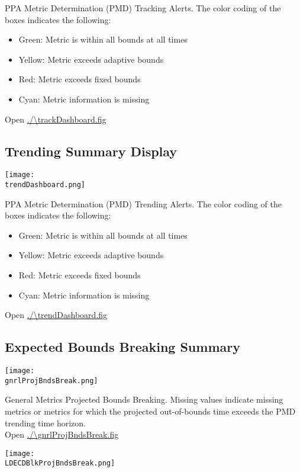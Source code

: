 PPA Metric Determination (PMD) Tracking Alerts. The color coding of
the boxes indicates the following:
\begin{itemize}
\setlength{\itemsep}{0ex}
\setlength{\parsep}{0ex}
\item Green:  Metric is within all bounds at all times
\item Yellow: Metric exceeds adaptive bounds
\item Red:    Metric exceeds fixed bounds
\item Cyan:   Metric information is missing
\end{itemize}
Open \url{./\trackDashboard.fig}

\subsection{Trending Summary Display}

\begin{center}
\texttt{[image: \\trendDashboard.png]}
\end{center}

PPA Metric Determination (PMD) Trending Alerts. The color coding of
the boxes indicates the following:
\begin{itemize}
\setlength{\itemsep}{0ex}
\setlength{\parsep}{0ex}
\item Green:  Metric is within all bounds at all times
\item Yellow: Metric exceeds adaptive bounds
\item Red:    Metric exceeds fixed bounds
\item Cyan:   Metric information is missing
\end{itemize}
Open \url{./\trendDashboard.fig}

\subsection{Expected Bounds Breaking Summary}

\begin{center}
\texttt{[image: \\gnrlProjBndsBreak.png]}
\end{center}

General Metrics Projected Bounds Breaking. Missing values indicate
missing metrics or metrics for which the projected out-of-bounds time
exceeds the PMD trending time horizon.\\
Open \url{./\gnrlProjBndsBreak.fig}

\begin{center}
\texttt{[image: \\LDECDBlkProjBndsBreak.png]}
\end{center}

